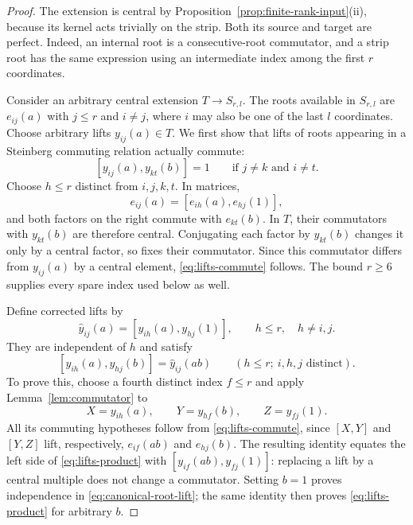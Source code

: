 \begin{proof}
The extension is central by
Proposition~\ref{prop:finite-rank-input}\textup{(ii)}, because its
kernel acts trivially on the strip. Both its source and target are
perfect. Indeed, an internal root is a consecutive-root commutator,
and a strip root has the same expression using an intermediate index
among the first $r$ coordinates.

Consider an arbitrary central extension $T\to S_{r,l}$. The roots
available in $S_{r,l}$ are $e_{ij}(a)$ with $j\leq r$ and
$i\ne j$, where $i$ may also be one of the last $l$ coordinates.
Choose arbitrary lifts $y_{ij}(a)\in T$. We first show that lifts of
roots appearing in a Steinberg commuting relation actually commute:
\begin{equation}\label{eq:lifts-commute}
 [y_{ij}(a),y_{kt}(b)]=1
 \qquad\text{if }j\ne k\text{ and }i\ne t.
\end{equation}
Choose $h\leq r$ distinct from $i,j,k,t$. In matrices,
\[
 e_{ij}(a)=[e_{ih}(a),e_{hj}(1)],
\]
and both factors on the right commute with $e_{kt}(b)$. In $T$,
their commutators with $y_{kt}(b)$ are therefore central. Conjugating
each factor by $y_{kt}(b)$ changes it only by a central factor, so
fixes their commutator. Since this commutator differs from
$y_{ij}(a)$ by a central element, \eqref{eq:lifts-commute} follows.
The bound $r\geq6$ supplies every spare index used below as well.

Define corrected lifts by
\begin{equation}\label{eq:canonical-root-lift}
 \widehat y_{ij}(a)=[y_{ih}(a),y_{hj}(1)],
 \qquad h\leq r,\quad h\ne i,j.
\end{equation}
They are independent of $h$ and satisfy
\begin{equation}\label{eq:lifts-product}
 [y_{ih}(a),y_{hj}(b)]=\widehat y_{ij}(ab)
 \qquad(h\leq r;\ i,h,j\text{ distinct}).
\end{equation}
To prove this, choose a fourth distinct index $f\leq r$ and apply
Lemma~\ref{lem:commutator} to
\[
 X=y_{ih}(a),\qquad Y=y_{hf}(b),\qquad Z=y_{fj}(1).
\]
All its commuting hypotheses follow from
\eqref{eq:lifts-commute}, since $[X,Y]$ and $[Y,Z]$ lift,
respectively, $e_{if}(ab)$ and $e_{hj}(b)$. The resulting identity
equates the left side of \eqref{eq:lifts-product} with
$[y_{if}(ab),y_{fj}(1)]$: replacing a lift by a central multiple does
not change a commutator. Setting $b=1$ proves independence in
\eqref{eq:canonical-root-lift}; the same identity then proves
\eqref{eq:lifts-product} for arbitrary $b$.


\end{proof}
